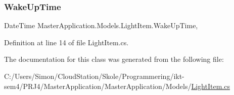 \subsubsection{\texorpdfstring{Wake\+Up\+Time}{WakeUpTime}}
{\footnotesize\ttfamily Date\+Time Master\+Application.\+Models.\+Light\+Item.\+Wake\+Up\+Time\hspace{0.3cm}{\ttfamily [get]}, {\ttfamily [set]}}



Definition at line 14 of file Light\+Item.\+cs.



The documentation for this class was generated from the following file\+:\begin{DoxyCompactItemize}
\item 
C\+:/\+Users/\+Simon/\+Cloud\+Station/\+Skole/\+Programmering/ikt-\/sem4/\+P\+R\+J4/\+Master\+Application/\+Master\+Application/\+Models/\mbox{\hyperlink{_master_application_2_master_application_2_models_2_light_item_8cs}{Light\+Item.\+cs}}\end{DoxyCompactItemize}
